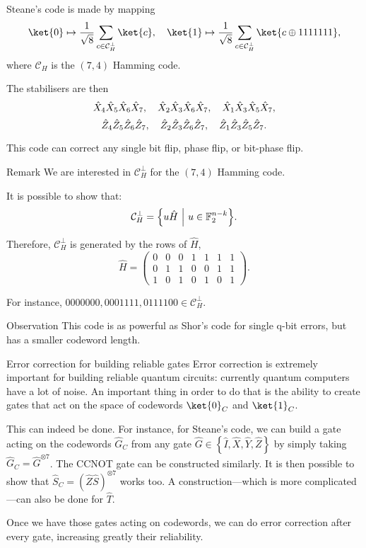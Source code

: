 \documentclass[a4paper]{article}
\begin{document}
\begin{parag}{Steane's code}
     is made by mapping 
    \[\ket{0} \mapsto \frac{1}{\sqrt{8}} \sum_{c \in \mathcal{C}_H^\perp} \ket{c}, \mathspace \ket{1} \mapsto \frac{1}{\sqrt{8}} \sum_{c \in \mathcal{C}_H^\perp} \ket{c \oplus 1111111},\]
    where $\mathcal{C}_H$ is the $\left(7, 4\right)$ Hamming code.

    The stabilisers are then 
    \[\hat{X}_4 \hat{X}_5 \hat{X}_6 \hat{X}_7, \quad \hat{X}_2 \hat{X}_3 \hat{X}_6 \hat{X}_7, \quad \hat{X}_1 \hat{X}_3 \hat{X}_5 \hat{X}_7,\] 
    \[\hat{Z}_4 \hat{Z}_5 \hat{Z}_6 \hat{Z}_7, \quad \hat{Z}_2 \hat{Z}_3 \hat{Z}_6 \hat{Z}_7, \quad \hat{Z}_1 \hat{Z}_3 \hat{Z}_5 \hat{Z}_7.\]
    
    This code can correct any single bit flip, phase flip, or bit-phase flip.
    
    \begin{subparag}{Remark}
        We are interested in $\mathcal{C}_H^\perp$ for the $\left(7, 4\right)$ Hamming code. 

        It is possible to show that: 
        \[\mathcal{C}_H^\perp = \left\{u\hat{H} \suchthat u \in \mathbb{F}_2^{n-k}\right\}.\]

        Therefore, $\mathcal{C}_H^\perp$ is generated by the rows of $\hat{H}$, 
        \[\hat{H} = \begin{pmatrix} 0 & 0 & 0 & 1 & 1 & 1 & 1 \\ 0 & 1 & 1 & 0 & 0 & 1 & 1 \\ 1 & 0 & 1 & 0 & 1 & 0 & 1 \end{pmatrix}  .\]
        
        For instance, $0000000, 0001111, 0111100 \in \mathcal{C}_H^\perp$.
    \end{subparag}

    \begin{subparag}{Observation}
        This code is as powerful as Shor's code for single q-bit errors, but has a smaller codeword length.
    \end{subparag}
\end{parag}

\begin{parag}{Error correction for building reliable gates}
    Error correction is extremely important for building reliable quantum circuits: currently quantum computers have a lot of noise. An important thing in order to do that is the ability to create gates that act on the space of codewords $\ket{0}_C$ and $\ket{1}_C$.

    This can indeed be done. For instance, for Steane's code, we can build a gate acting on the codewords $\hat{G}_C$ from any gate $\hat{G}\in \left\{\hat{I}, \hat{X}, \hat{Y}, \hat{Z}\right\}$ by simply taking $\hat{G}_C = \hat{G}^{\otimes 7}$. The CCNOT gate can be constructed similarly. It is then possible to show that $\hat{S}_C = \left(\hat{Z} \hat{S}\right)^{\otimes 7}$ works too. A construction---which is more complicated---can also be done for $\hat{T}$.

    Once we have those gates acting on codewords, we can do error correction after every gate, increasing greatly their reliability.
\end{parag}
 
\end{document}
